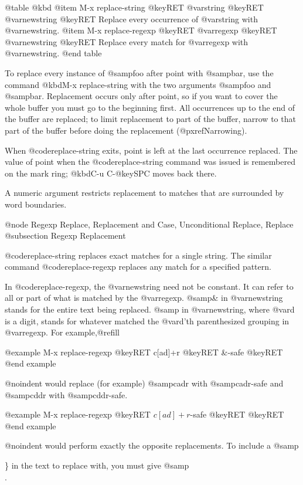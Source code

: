 {{{{{{{{{{{{{{{{{{@table @kbd
@item M-x replace-string @key{RET} @var{string} @key{RET} @var{newstring} @key{RET}
Replace every occurrence of @var{string} with @var{newstring}.
@item M-x replace-regexp @key{RET} @var{regexp} @key{RET} @var{newstring} @key{RET}
Replace every match for @var{regexp} with @var{newstring}.
@end table

  To replace every instance of @samp{foo} after point with @samp{bar}, use
the command @kbd{M-x replace-string} with the two arguments @samp{foo} and
@samp{bar}.  Replacement occurs only after point, so if you want to cover
the whole buffer you must go to the beginning first.  All occurrences up to
the end of the buffer are replaced; to limit replacement to part of the
buffer, narrow to that part of the buffer before doing the replacement
(@pxref{Narrowing}).

  When @code{replace-string} exits, point is left at the last occurrence
replaced.  The value of point when the @code{replace-string} command was
issued is remembered on the mark ring; @kbd{C-u C-@key{SPC}} moves back
there.

  A numeric argument restricts replacement to matches that are surrounded
by word boundaries.

@node Regexp Replace, Replacement and Case, Unconditional Replace, Replace
@subsection Regexp Replacement

  @code{replace-string} replaces exact matches for a single string.  The
similar command @code{replace-regexp} replaces any match for a specified
pattern.

  In @code{replace-regexp}, the @var{newstring} need not be constant.  It
can refer to all or part of what is matched by the @var{regexp}.  @samp{\&}
in @var{newstring} stands for the entire text being replaced.
@samp{} in @var{newstring}, where @var{d} is a digit, stands for
whatever matched the @var{d}'th parenthesized grouping in @var{regexp}.
For example,@refill

@example
M-x replace-regexp @key{RET} c[ad]+r @key{RET} \&-safe @key{RET}
@end example

@noindent
would replace (for example) @samp{cadr} with @samp{cadr-safe} and @samp{cddr}
with @samp{cddr-safe}.

@example
M-x replace-regexp @key{RET} \(c[ad]+r\)-safe @key{RET} \1 @key{RET}
@end example

@noindent
would perform exactly the opposite replacements.  To include a @samp{\}
in the text to replace with, you must give @samp{\\}.

}}}}}}}}}}}}}}}}}}}
